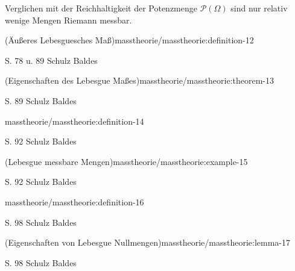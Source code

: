 \par
Verglichen mit der Reichhaltigkeit der Potenzmenge \(\mathcal{P}(\Omega)\) sind nur relativ wenige Mengen Riemann messbar.
\begin{definition}{(Äußeres Lebesguesches Maß)}{masstheorie/masstheorie:definition-12}



\par
S. 78 u. 89 Schulz Baldes
\end{definition}
\begin{theorem}{(Eigenschaften des Lebesgue Maßes)}{masstheorie/masstheorie:theorem-13}



\par
S. 89 Schulz Baldes
\end{theorem}
\begin{definition}{}{masstheorie/masstheorie:definition-14}



\par
S. 92 Schulz Baldes
\end{definition}
\begin{example}{(Lebesgue messbare Mengen)}{masstheorie/masstheorie:example-15}



\par
S. 92 Schulz Baldes
\end{example}
\begin{definition}{}{masstheorie/masstheorie:definition-16}



\par
S. 98 Schulz Baldes
\end{definition}
\begin{lemma}{(Eigenschaften von Lebesgue Nullmengen)}{masstheorie/masstheorie:lemma-17}



\par
S. 98 Schulz Baldes
\end{lemma}
